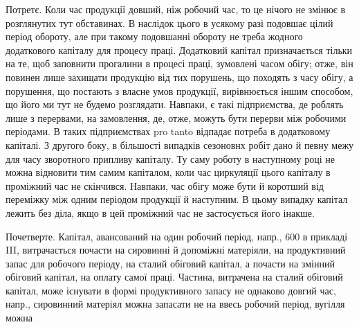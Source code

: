Потретє. Коли час продукції довший, ніж робочий час, то це нічого
не змінює в розглянутих тут обставинах. В наслідок цього в усякому
разі подовшає цілий період обороту, але при такому подовшанні обороту
не треба жодного додаткового капіталу для процесу праці. Додатковий
капітал призначається тільки на те, щоб заповнити прогалини в процесі
праці, зумовлені часом обігу; отже, він повинен лише захищати
продукцію від тих порушень, що походять з часу обігу, а порушення,
що постають з власне умов продукції, вирівнюється іншим способом, що
його ми тут не будемо розглядати. Навпаки, є такі підприємства, де роблять
лише з перервами, на замовлення, де, отже, можуть бути перерви
між робочими періодами. В таких підприємствах pro tanto відпадає потреба
в додатковому капіталі. З другого боку, в більшості випадків сезоновнх
робіт дано й певну межу для часу зворотного припливу капіталу.
Ту саму роботу в наступному році не можна відновити тим самим капіталом,
коли час циркуляції цього капіталу в проміжний час не скінчився. Навпаки,
час обігу може бути й коротший від переміжку між одним періодом
продукції й наступним. В цьому випадку капітал лежить без діла,
якщо в цей проміжний час не застосується його інакше.

Почетверте. Капітал, авансований на один робочий період, напр.,
600 в прикладі III, витрачається почасти на сировинні й допоміжні
матеріяли, на продуктивний запас для робочого періоду, на сталий обіговий
капітал, а почасти на змінний обіговий капітал, на оплату самої
праці. Частина, витрачена на сталий обіговий капітал, може існувати в
формі продуктивного запасу не однаково довгий час, напр., сировинний
матеріял можна запасати не на ввесь робочий період, вугілля можна
\parbreak{}  %
